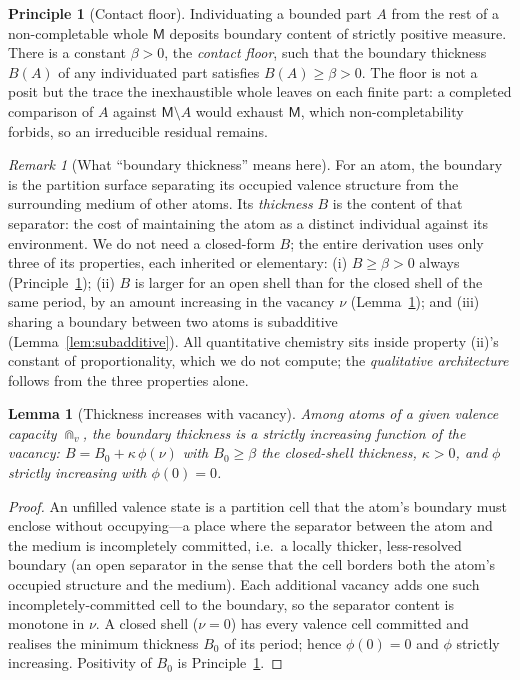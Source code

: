 \documentclass[11pt,a4paper]{article}
\theoremstyle{thmstyle}
\newtheorem{lemma}[theorem]{Lemma}
\theoremstyle{definition}
\newtheorem{principle}[theorem]{Principle}
\theoremstyle{remark}
\newtheorem{remark}[theorem]{Remark}
\newcommand{\floorc}{\beta}
\newcommand{\thick}{B}                 %
\newcommand{\med}{\mathsf{M}}          %
\newcommand{\vac}{\nu}                 %
\begin{document}
\begin{principle}[Contact floor]
\label{prin:floor}
Individuating a bounded part $A$ from the rest of a non-completable whole
$\med$ deposits boundary content of strictly positive measure. There is a
constant $\floorc>0$, the \emph{contact floor}, such that the boundary
thickness $\thick(A)$ of any individuated part satisfies
$\thick(A)\ge\floorc>0$. The floor is not a posit but the trace the
inexhaustible whole leaves on each finite part: a completed comparison of
$A$ against $\med\setminus A$ would exhaust $\med$, which
non-completability forbids, so an irreducible residual remains.
\end{principle}

\begin{remark}[What ``boundary thickness'' means here]
\label{rem:thickness}
For an atom, the boundary is the partition surface separating its
occupied valence structure from the surrounding medium of other atoms. Its
\emph{thickness} $\thick$ is the content of that separator: the cost of
maintaining the atom as a distinct individual against its environment. We
do not need a closed-form $\thick$; the entire derivation uses only three
of its properties, each inherited or elementary: (i) $\thick\ge\floorc>0$
always (Principle~\ref{prin:floor}); (ii) $\thick$ is larger for an open
shell than for the closed shell of the same period, by an amount
increasing in the vacancy $\vac$ (Lemma~\ref{lem:thickness-vacancy}); and
(iii) sharing a boundary between two atoms is subadditive
(Lemma~\ref{lem:subadditive}). All quantitative chemistry sits inside
property (ii)'s constant of proportionality, which we do not compute; the
\emph{qualitative architecture} follows from the three properties alone.
\end{remark}

\begin{lemma}[Thickness increases with vacancy]
\label{lem:thickness-vacancy}
Among atoms of a given valence capacity $\Cap_v$, the boundary thickness
is a strictly increasing function of the vacancy:
$\thick=\thick_{0}+\kappa\,\phi(\vac)$ with $\thick_0\ge\floorc$ the
closed-shell thickness, $\kappa>0$, and $\phi$ strictly increasing with
$\phi(0)=0$.
\end{lemma}

\begin{proof}
An unfilled valence state is a partition cell that the atom's boundary
must enclose without occupying---a place where the separator between the
atom and the medium is incompletely committed, i.e.\ a locally thicker,
less-resolved boundary (an open separator in the sense that the cell
borders both the atom's occupied structure and the medium). Each
additional vacancy adds one such incompletely-committed cell to the
boundary, so the separator content is monotone in $\vac$. A closed shell
($\vac=0$) has every valence cell committed and realises the minimum
thickness $\thick_0$ of its period; hence $\phi(0)=0$ and $\phi$ strictly
increasing. Positivity of $\thick_0$ is Principle~\ref{prin:floor}.
\end{proof}
\end{document}
